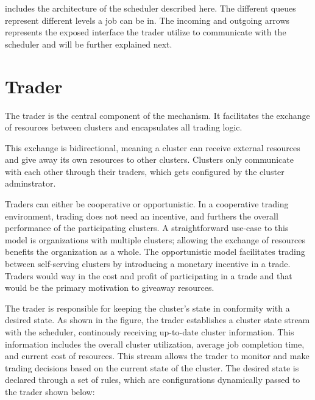  includes the architecture of the scheduler described here. The
different queues represent different levels a job can be in. The incoming and
outgoing arrows represents the exposed interface the trader utilize to
communicate with the scheduler and will be further explained next.






\section{Trader} \label{trader}

The trader is the central component of the mechanism. It facilitates the
exchange of resources between clusters and encapsulates all trading logic. 

This exchange is bidirectional, meaning a cluster can receive external
resources and give away its own resources to other clusters. Clusters only
communicate with each other through their traders, which gets configured by the
cluster adminstrator. 

Traders can either be cooperative or opportunistic. In a cooperative trading
environment, trading does not need an incentive, and furthers the overall
performance of the participating clusters. A straightforward use-case to this
model is organizations with multiple clusters; allowing the exchange of
resources benefits the organization as a whole. The opportunistic model
facilitates trading between self-serving clusters by introducing a monetary
incentive in a trade. Traders would way in the cost and profit of participating
in a trade and that would be the primary motivation to giveaway resources.  

The trader is responsible for keeping the cluster's state in conformity with a
desired state. As shown in the figure, the trader establishes a cluster state
stream with the scheduler, continously receiving up-to-date cluster
information. This information includes the overall cluster utilization, average
job completion time, and current cost of resources. This stream allows the
trader to monitor and make trading decisions based on the current state of the
cluster. The desired state is declared through a set of rules, which are
configurations dynamically passed to the trader shown below:  

